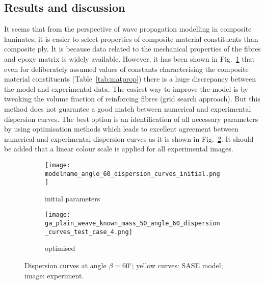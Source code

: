 \documentclass[preprint,12pt]{elsarticle}
\begin{document}
	\subsection{Results and discussion}
It seems that from the perspective of wave propagation modelling in composite laminates, it is easier to select properties of composite material constituents than composite ply. It is because data related to the mechanical properties of the fibres and epoxy matrix is widely available. However, it has been shown in Fig.~\ref{fig:dispersion60deg_initial} that even for deliberately assumed values of constants characterising the composite material constituents (Table~\ref{tab:matprop}) there is a huge discrepancy between the model and experimental data. The easiest way to improve the model is by tweaking the volume fraction of reinforcing fibres (grid search approach). But this method does not guarantee a good match between numerical and experimental dispersion curves. The best option is an identification of all necessary parameters by using optimisation methods which leads to excellent agreement between numerical and experimental dispersion curves as it is shown in Fig.~\ref{fig:dispersion60deg}. It should be added that a linear colour scale is applied for all experimental images.
	\begin{figure} [h!]
		\newcommand{\modelname}{ga_plain_weave_known_mass}
		\centering
		\begin{subfigure}[b]{0.49\textwidth}
			\centering
		   \texttt{[image: \\modelname\_angle\_60\_dispersion\_curves\_initial.png]}
			\caption{initial parameters}
			\label{fig:dispersion60deg_initial}
		\end{subfigure}
		\begin{subfigure}[b]{0.49\textwidth}
			\centering
			\texttt{[image: ga\_plain\_weave\_known\_mass\_50\_angle\_60\_dispersion\_curves\_test\_case\_4.png]}
			\caption{optimised}
			\label{fig:dispersion60deg}
		\end{subfigure}
	\caption{Dispersion curves at angle $\beta = 60^{\circ}$; yellow curves: SASE model; image: experiment. }
	\label{fig:initial_optimized}
	\end{figure}
\end{document}
